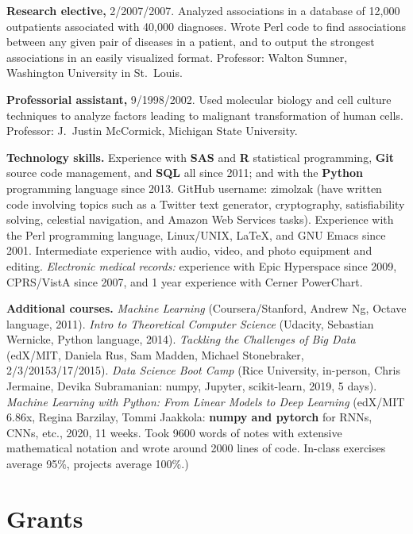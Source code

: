 \documentclass[10pt]{article}
\begin{document}
\textbf{Research elective,} 2/2007/2007. Analyzed associations
in a database of 12,000 outpatients associated with 40,000 diagnoses.
Wrote Perl code to find associations between any given pair of
diseases in a patient, and to output the strongest associations in an
easily visualized format. Professor: Walton Sumner, Washington
University in St.\ Louis.

\textbf{Professorial assistant,} 9/1998/2002. Used molecular
biology and cell culture techniques to analyze factors leading to
malignant transformation of human cells. Professor: J.\ Justin
McCormick, Michigan State University.

\textbf{Technology skills.} Experience with \textbf{SAS} and
\textbf{R} statistical programming, \textbf{Git} source code
management, and \textbf{SQL} all since 2011; and with the
\textbf{Python} programming language since 2013. GitHub username:
zimolzak (have written code involving topics such as a Twitter text
generator, cryptography, satisfiability solving, celestial navigation,
and Amazon Web Services tasks). Experience with the Perl programming
language, Linux/UNIX, \LaTeX, and GNU Emacs since 2001. Intermediate
experience with audio, video, and photo equipment and editing.
\emph{Electronic medical records:} experience with Epic Hyperspace
since 2009, CPRS/VistA since 2007, and 1 year experience with Cerner
PowerChart.

\textbf{Additional courses.} \emph{Machine Learning}
(Coursera/Stanford, Andrew Ng, Octave language, 2011). \emph{Intro to
Theoretical Computer Science} (Udacity, Sebastian Wernicke, Python
language, 2014). \emph{Tackling the Challenges of Big Data} (edX/MIT,
Daniela Rus, Sam Madden, Michael Stonebraker,
2/3/2015\ndash{}3/17/2015). \emph{Data Science Boot Camp} (Rice
University, in-person, Chris Jermaine, Devika Subramanian: numpy,
Jupyter, scikit-learn, 2019, 5 days). \emph{Machine Learning with
Python: From Linear Models to Deep Learning} (edX/MIT 6.86x, Regina
Barzilay, Tommi Jaakkola: \textbf{numpy and pytorch} for RNNs, CNNs,
etc., 2020, 11 weeks. Took 9600 words of notes with extensive
mathematical notation and wrote around 2000 lines of code. In-class
exercises average 95\%, projects average 100\%.)




\section*{Grants}
\end{document}
